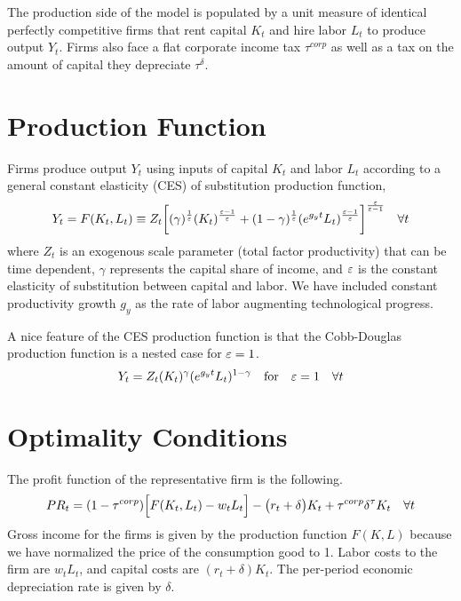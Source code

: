 
The production side of the \ogindia model is populated by a unit measure of identical perfectly competitive firms that rent capital $K_t$ and hire labor $L_t$ to produce output $Y_t$. Firms also face a flat corporate income tax $\tau^{corp}$ as well as a tax on the amount of capital they depreciate $\tau^\delta$.


\section{Production Function}\label{EqFirmsProdFunc}

  Firms produce output $Y_t$ using inputs of capital $K_t$ and labor $L_t$ according to a general constant elasticity (CES) of substitution production function,
  \begin{equation}\label{EqFirmsCESprodfun}
    Y_t = F(K_t, L_t) \equiv Z_t\biggl[(\gamma)^\frac{1}{\varepsilon}(K_t)^\frac{\varepsilon-1}{\varepsilon} + (1-\gamma)^\frac{1}{\varepsilon}(e^{g_y t}L_t)^\frac{\varepsilon-1}{\varepsilon}\biggr]^\frac{\varepsilon}{\varepsilon-1} \quad\forall t
  \end{equation}
  where $Z_t$ is an exogenous scale parameter (total factor productivity) that can be time dependent, $\gamma$ represents the capital share of income, and $\varepsilon$ is the constant elasticity of substitution between capital and labor. We have included constant productivity growth $g_y$ as the rate of labor augmenting technological progress.

  A nice feature of the CES production function is that the Cobb-Douglas production function is a nested case for $\varepsilon=1$.
  \begin{equation}\label{EqFirmsCDprodfun}
    Y_t = Z_t(K_t)^\gamma(e^{g_y t}L_t)^{1-\gamma} \quad\text{for}\quad \varepsilon=1 \quad\forall t
  \end{equation}


\section{Optimality Conditions}\label{EqFirmsFOC}

  The profit function of the representative firm is the following.
  \begin{equation}\label{EqFirmsProfit}
    PR_t = (1 - \tau^{corp})\Bigl[F(K_t,L_t) - w_t L_t\Bigr] - \bigl(r_t + \delta\bigr)K_t + \tau^{corp}\delta^\tau K_t \quad\forall t
  \end{equation}
  Gross income for the firms is given by the production function $F(K,L)$ because we have normalized the price of the consumption good to 1. Labor costs to the firm are $w_t L_t$, and capital costs are $(r_t +\delta)K_t$. The per-period economic depreciation rate is given by $\delta$.

